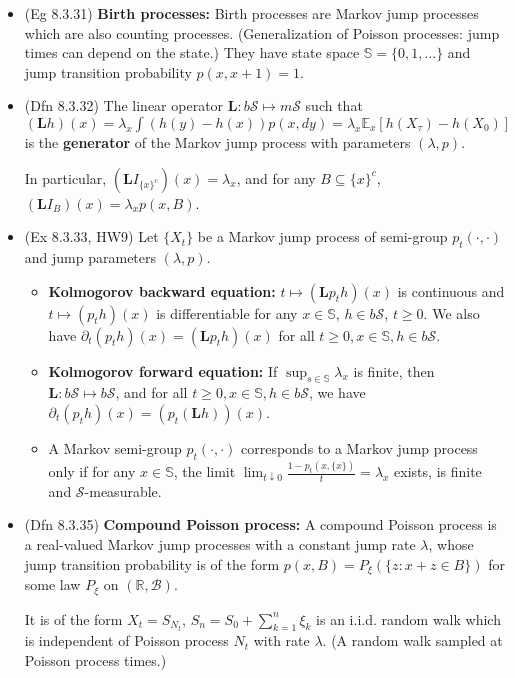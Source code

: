 \documentclass[twoside]{article}
\newcommand{\dis}{\displaystyle}
\newcommand\bbE{\mathbb{E}}
\newcommand\bbR{\mathbb{R}}
\newcommand\bbS{\mathbb{S}}
\newcommand\calB{\mathcal{B}}
\newcommand\calS{\mathcal{S}}
\newcommand\lmb{\lambda}
\begin{document}
\begin{itemize}
\item (Eg 8.3.31) \textbf{Birth processes:} Birth processes are Markov jump processes which are also counting processes. (Generalization of Poisson processes: jump times can depend on the state.) They have state space $\bbS = \{ 0, 1, \dots\}$ and jump transition probability $p(x, x+1) = 1$.

\item (Dfn 8.3.32) The linear operator $\mathbf{L}: b\calS \mapsto m\calS$ such that $(\mathbf{L}h)(x) = \lmb_x \dis\int (h(y) - h(x))p(x,dy) = \lmb_x \bbE_x [h(X_\tau) - h(X_0)]$ is the \textbf{generator} of the Markov jump process with parameters $(\lmb, p)$.

In particular, $(\mathbf{L}I_{\{x\}^c})(x) = \lmb_x$, and for any $B \subseteq \{ x\}^c$, $(\mathbf{L}I_B)(x) = \lmb_x p(x,B)$.

\item (Ex 8.3.33, HW9) Let $\{ X_t\}$ be a Markov jump process of semi-group $p_t(\cdot, \cdot)$ and jump parameters $(\lmb, p)$.
\begin{itemize}
\item \textbf{Kolmogorov backward equation:} $t \mapsto (\mathbf{L}p_t h)(x)$ is continuous and $t \mapsto (p_t h)(x)$ is differentiable for any $x \in \bbS$, $h \in b\calS$, $t \geq 0$. We also have $\partial_t (p_t h)(x) = (\mathbf{L}p_t h)(x)$ for all $t \geq 0, x \in \bbS, h \in b\calS$.

\item \textbf{Kolmogorov forward equation:} If $\sup_{s \in \bbS} \lmb_x$ is finite, then $\mathbf{L}: b\calS \mapsto b\calS$, and for all $t \geq 0, x \in \bbS, h \in b\calS$, we have $\partial_t (p_t h)(x) = (p_t(\mathbf{L}h))(x)$.

\item A Markov semi-group $p_t(\cdot, \cdot)$ corresponds to a Markov jump process only if for any $x \in \bbS$, the limit $\dis\lim_{t \downarrow 0}\frac{1 - p_t(x, \{ x\})}{t} = \lmb_x$ exists, is finite and $\calS$-measurable.
\end{itemize}

\item (Dfn 8.3.35) \textbf{Compound Poisson process:} A compound Poisson process is a real-valued Markov jump processes with a constant jump rate $\lmb$, whose jump transition probability is of the form $p(x, B) = P_\xi (\{ z: x + z \in B\})$ for some law $P_\xi$ on $(\bbR, \calB)$.

It is of the form $X_t = S_{N_t}$, $S_n = S_0 + \dis\sum_{k=1}^n \xi_k$ is an i.i.d. random walk which is independent of Poisson process $N_t$ with rate $\lmb$. (A random walk sampled at Poisson process times.)


\end{itemize}
\end{document}
